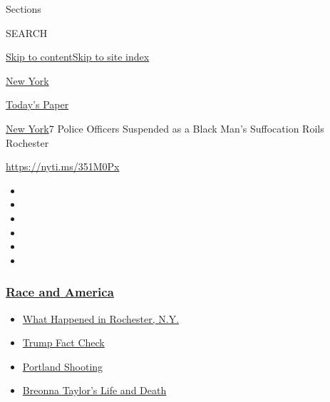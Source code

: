 Sections

SEARCH

\protect\hyperlink{site-content}{Skip to
content}\protect\hyperlink{site-index}{Skip to site index}

\href{https://www.nytimes3xbfgragh.onion/section/nyregion}{New York}

\href{https://myaccount.nytimes3xbfgragh.onion/auth/login?response_type=cookie\&client_id=vi}{}

\href{https://www.nytimes3xbfgragh.onion/section/todayspaper}{Today's
Paper}

\href{/section/nyregion}{New York}\textbar{}7 Police Officers Suspended
as a Black Man's Suffocation Roils Rochester

\url{https://nyti.ms/351M0Px}

\begin{itemize}
\item
\item
\item
\item
\item
\item
\end{itemize}

\hypertarget{race-and-america}{%
\subsubsection{\texorpdfstring{\href{https://www.nytimes3xbfgragh.onion/news-event/george-floyd-protests-minneapolis-new-york-los-angeles?name=styln-george-floyd\&region=TOP_BANNER\&block=storyline_menu_recirc\&action=click\&pgtype=Article\&impression_id=c6423970-f291-11ea-8ecb-a3874efea1d0\&variant=undefined}{Race
and America}}{Race and America}}\label{race-and-america}}

\begin{itemize}
\tightlist
\item
  \href{https://www.nytimes3xbfgragh.onion/2020/09/04/nyregion/rochester-police-daniel-prude.html?name=styln-george-floyd\&region=TOP_BANNER\&block=storyline_menu_recirc\&action=click\&pgtype=Article\&impression_id=c6423971-f291-11ea-8ecb-a3874efea1d0\&variant=undefined}{What
  Happened in Rochester, N.Y.}
\item
  \href{https://www.nytimes3xbfgragh.onion/2020/09/01/us/politics/trump-fact-check-protests.html?name=styln-george-floyd\&region=TOP_BANNER\&block=storyline_menu_recirc\&action=click\&pgtype=Article\&impression_id=c6426080-f291-11ea-8ecb-a3874efea1d0\&variant=undefined}{Trump
  Fact Check}
\item
  \href{https://www.nytimes3xbfgragh.onion/2020/08/30/us/portland-shooting-explained.html?name=styln-george-floyd\&region=TOP_BANNER\&block=storyline_menu_recirc\&action=click\&pgtype=Article\&impression_id=c6426081-f291-11ea-8ecb-a3874efea1d0\&variant=undefined}{Portland
  Shooting}
\item
  \href{https://www.nytimes3xbfgragh.onion/2020/08/30/us/breonna-taylor-police-killing.html?name=styln-george-floyd\&region=TOP_BANNER\&block=storyline_menu_recirc\&action=click\&pgtype=Article\&impression_id=c6426082-f291-11ea-8ecb-a3874efea1d0\&variant=undefined}{Breonna
  Taylor's Life and Death}
\end{itemize}

